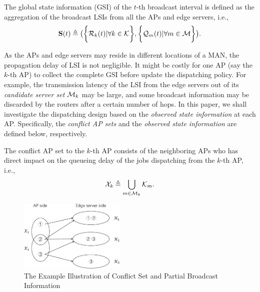 \begin{definition}
    The global state information (GSI) of the $t$-th broadcast interval is defined as the aggregation of the broadcast LSIs from all the APs and edge servers, i.e.,
    \begin{align}
        \mathbf{S}(t) \triangleq
            \big(
                \bigg\{\mathcal{R}_{k}(t)|\forall k\in\mathcal{K}\bigg\},
                \bigg\{\mathcal{Q}_{m}(t)|\forall m\in\mathcal{M}\bigg\}
            \big).
    \end{align}
\end{definition}

As the APs and edge servers may reside in different locations of a MAN, the propagation delay of LSI is not negligible.
It might be costly for one AP (say the $k$-th AP) to collect the complete GSI before update the dispatching policy.
For example, the transmission latency of the LSI from the edge servers out of its \emph{candidate server set} $\mathcal{M}_{k}$ may be large, and some broadcast information may be discarded by the routers after a certain number of hops.
In this paper, we shall investigate the dispatching design based on the \emph{observed state information} at each AP.
Specifically, the \emph{conflict AP sets} and the \emph{observed state information} are defined below, respectively.
\begin{definition}
    The conflict AP set to the $k$-th AP consists of the neighboring APs who has direct impact on the queueing delay of the jobs dispatching from the $k$-th AP, i.e.,
    \begin{align}
        \mathcal{X}_{k} \triangleq \bigcup_{m\in\mathcal{M}_{k}} \mathcal{K}_{m}.
    \end{align}
\end{definition}

\begin{figure}[tp]
    \centering
    \includegraphics[width=0.45\textwidth]{images/conflict.pdf}
    \caption{The Example Illustration of Conflict Set and Partial Broadcast Information}
    \label{fig:conflict}
\end{figure}

